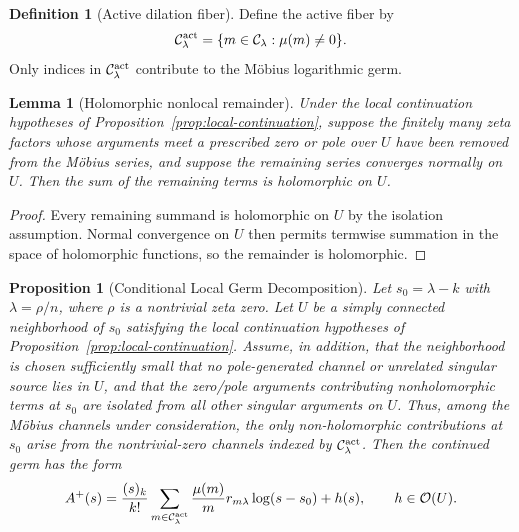 \documentclass[11pt]{article}
\newtheorem{proposition}[theorem]{Proposition}
\newtheorem{lemma}[theorem]{Lemma}
\theoremstyle{definition}
\newtheorem{definition}[theorem]{Definition}
\newcommand{\C}{\mathcal C}
\newcommand{\Ocal}{\mathcal O}
\begin{document}
\begin{definition}[Active dilation fiber]
Define the active fiber by
\[
\C_\lambda^{\rm act}=\{m\in\C_\lambda:\mu(m)\ne0\}.
\]
Only indices in $\C_\lambda^{\rm act}$ contribute to the Möbius logarithmic germ.
\end{definition}

\begin{lemma}[Holomorphic nonlocal remainder]
\label{lem:nonlocal-remainder}
Under the local continuation hypotheses of Proposition~\ref{prop:local-continuation}, suppose the finitely many zeta factors whose arguments meet a prescribed zero or pole over $U$ have been removed from the Möbius series, and suppose the remaining series converges normally on $U$. Then the sum of the remaining terms is holomorphic on $U$.
\end{lemma}

\begin{proof}
Every remaining summand is holomorphic on $U$ by the isolation assumption. Normal convergence on $U$ then permits termwise summation in the space of holomorphic functions, so the remainder is holomorphic.
\end{proof}

\begin{proposition}[Conditional Local Germ Decomposition]
\label{prop:local-germ}
Let $s_0=\lambda-k$ with $\lambda=\rho/n$, where $\rho$ is a nontrivial zeta zero. Let $U$ be a simply connected neighborhood of $s_0$ satisfying the local continuation hypotheses of Proposition~\ref{prop:local-continuation}. Assume, in addition, that the neighborhood is chosen sufficiently small that no pole-generated channel or unrelated singular source lies in $U$, and that the zero/pole arguments contributing nonholomorphic terms at $s_0$ are isolated from all other singular arguments on $U$. Thus, among the Möbius channels under consideration, the only non-holomorphic contributions at $s_0$ arise from the nontrivial-zero channels indexed by $\C_\lambda^{\rm act}$. Then the continued germ has the form
\[
A^+(s)=
\frac{(s)_k}{k!}
\sum_{m\in\C_\lambda^{\rm act}}
\frac{\mu(m)}m r_{m\lambda}\log(s-s_0)+h(s),
\qquad h\in\Ocal(U).
\]
\end{proposition}
\end{document}
